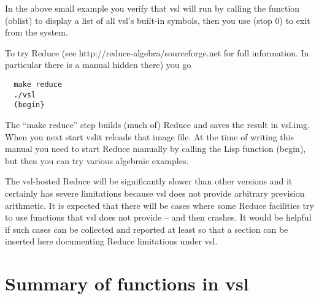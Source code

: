 \documentclass[a4paper,12pt]{article}
\newcommand{\vsl}{{\ttfamily vsl}}
\newcommand{\tx}{\ttfamily}
\newcommand{\sverb}{\small\begin{verbatim}}
\begin{document}
In the above small example you verify that \vsl{} will run by calling the
function {\tx (oblist)} to display a list of all \vsl's built-in
symbols, then you use {\tx (stop 0)} to exit from the system.

To try Reduce (see {\tx http://reduce-algebra/sourceforge.net} for
full information. In particular there is a manual hidden there) you go
{\sverb
  make reduce
  ./vsl
  (begin}
\end{verbatim}}

The ``{\tx make reduce}'' step builds (much of) Reduce and saves
the result in {\tx vsl.img}. When you next start \vsl it reloads that
image file. At the time of writing this manual you need to start Reduce
manually by calling the Lisp function {\tx (begin)}, but then you can
try various algebraic examples.

The \vsl-hosted Reduce will be significantly slower than other versions
and it certainly has severe limitations because \vsl{} does not provide
arbitrary prevision arithmetic. It is expected that there will be cases
where some Reduce facilities try to use functions that \vsl{} does not
provide -- and then crashes. It would be helpful if such cases can be
collected and reported at least so that a section can be inserted here
documenting Reduce limitations under \vsl.


\section{Summary of functions in \vsl}




\end{document}

